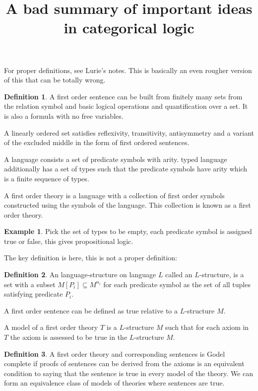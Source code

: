 \documentclass[10pt]{article}
\theoremstyle{plain}%
\theoremstyle{definition}
\newtheorem{definition}{Definition}[section]
\newtheorem{example}{Example}[section]
\theoremstyle{remark}
\begin{document}
\title{A bad summary of important ideas in categorical logic}

\maketitle

For proper definitions, see Lurie's notes. This is basically an even rougher version of this that can be totally wrong.

\begin{definition}
	A first order sentence can be built from finitely many sets from the relation symbol and basic logical operations and quantification over a set. It is also a formula with no free variables.

	A linearly ordered set satisfies reflexivity, transitivity, antisymmetry and a variant of the excluded middle in the form of first ordered sentences.
	
	A language consists a set of predicate symbols with arity. 
	 typed language additionally has a set of types such that the predicate symbols have arity which is a finite sequence of types.
	
	A first order theory is a language with a collection of first order symbols constructed using the symbols of the language. This collection is known as a first order theory.
\end{definition}

\begin{example}
	Pick the set of types to be empty, each predicate symbol is assigned true or false, this gives propositional logic.
\end{example}

The key definition is here, this is not a proper definition:

\begin{definition}
	An language-structure on language $L$ called an $L$-structure, is a set with a subset $M[P_i] \subseteq M^{n_i}$ for each predicate symbol as the set of all tuples satisfying predicate $P_i$.
	
	A first order sentence can be defined as true relative to a $L$-structure $M$.

	A model of a first order theory $T$ is a $L$-structure $M$ such that for each axiom in $T$ the axiom is assessed to be true in the $L$-structure $M$.
\end{definition}

\begin{definition}
	A first order theory and corresponding sentences is Godel complete if proofs of sentences can be derived from the axioms is an equivalent condition to saying that the sentence is true in every model of the theory. We can form an equivalence class of models of theories where sentences are true.
\end{definition}
\end{document}
